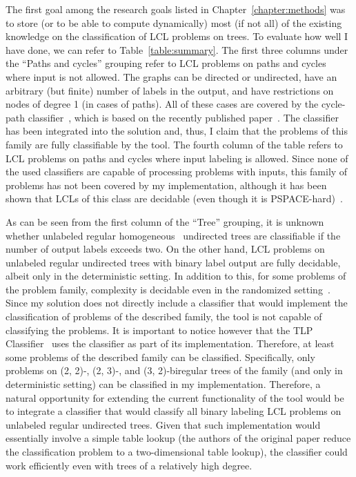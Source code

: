 The first goal among the research goals listed in Chapter~\ref{chapter:methods}
was to store (or to be able to compute dynamically) most
(if not all) of the existing knowledge on the classification of LCL problems on trees.
To evaluate how well I have done, we can refer to Table~\ref{table:summary}.
The first three columns under the ``Paths and cycles'' grouping refer to LCL problems on
paths and cycles where input is not allowed. The graphs can be directed or undirected,
have an arbitrary (but finite) number of labels in the output, and have restrictions
on nodes of degree 1 (in cases of paths). All of these cases are covered by
the cycle-path classifier~\cite{Tereshchenko2020}, which is based on the recently
published paper~\cite{Chang2020}. The classifier has been integrated into the
solution and, thus, I claim that the problems of this family are fully classifiable by the tool.
The fourth column of the table refers to LCL problems on paths and cycles
where input labeling is allowed. Since none of the used classifiers
are capable of processing problems with inputs, this family of problems
has not been covered by my implementation, although it has been shown that
LCLs of this class are decidable (even though it is PSPACE-hard)~\cite{Balliu2018}.

As can be seen from the first column of the ``Tree'' grouping, it is unknown whether
unlabeled regular homogeneous~\cite{BalliuHomogeneous}
undirected trees are classifiable if the number of
output labels exceeds two. On the other hand, LCL problems on
unlabeled regular undirected trees with binary label output are fully decidable, albeit
only in the deterministic setting. In addition to this, for some problems of the problem family,
complexity is decidable even in the randomized setting~\cite{Balliu2019c}.
Since my solution does not directly include a classifier that would implement
the classification of problems of the described family, the tool is not capable of
classifying the problems. It is important to notice however that the TLP
Classifier~\cite{Rocher2020clas} uses the classifier as part of its implementation.
Therefore, at least some problems of the described family can be classified. Specifically,
only problems on (2, 2)-, (2, 3)-, and (3, 2)-biregular trees of the family
(and only in deterministic setting) can be classified in my implementation.
Therefore, a natural opportunity for extending the current functionality of the tool
would be to integrate a classifier that would classify all binary labeling LCL problems
on unlabeled regular undirected trees. Given that such implementation would
essentially involve a simple table lookup (the authors of the original paper
reduce the classification problem to a two-dimensional table lookup), the
classifier could work efficiently even with trees of
a relatively high degree.

